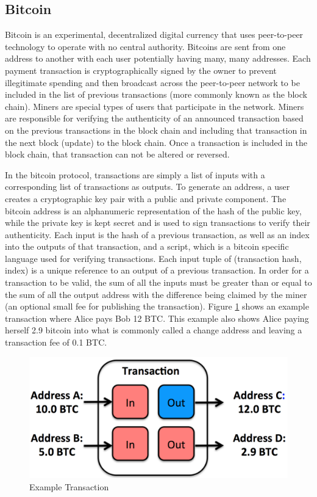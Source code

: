 \documentclass[10pt, letterpaper, twocolumn, twoside]{article}
\begin{document}
\subsection{Bitcoin}
Bitcoin is an experimental, decentralized digital currency that uses peer-to-peer technology to operate with no central authority. Bitcoins are sent from one address to another with each user potentially having many, many addresses. Each payment transaction is cryptographically signed by the owner to prevent illegitimate spending and then broadcast across the peer-to-peer network to be included in the list of previous transactions (more commonly known as the block chain). Miners are special types of users that participate in the network. Miners are responsible for verifying the authenticity of an announced transaction based on the previous transactions in the block chain and including that transaction in the next block (update) to the block chain. Once a transaction is included in the block chain, that transaction can not be altered or reversed.

In the bitcoin protocol, transactions are simply a list of inputs with a corresponding list of transactions as outputs. To generate an address, a user creates a cryptographic key pair with a public and private component. The bitcoin address is an alphanumeric representation of the hash of the public key, while the private key is kept secret and is used to sign transactions to verify their authenticity. Each input is the hash of a previous transaction, as well as an index into the outputs of that transaction, and a script, which is a bitcoin specific language used for verifying transactions. Each input tuple of (transaction hash, index) is a unique reference to an output of a previous transaction. In order for a transaction to be valid, the sum of all the inputs must be greater than or equal to the sum of all the output address with the difference being claimed by the miner (an optional small fee for publishing the transaction).  Figure \ref{fig:transaction} shows an example transaction where Alice pays Bob 12 BTC. This example also shows Alice paying herself 2.9 bitcoin into what is commonly called a change address and leaving a transaction fee of 0.1 BTC.

\begin{figure}
  \includegraphics[width=\linewidth]{transaction2.png}
  \caption{Example Transaction}
  \label{fig:transaction}
\end{figure}
\end{document}
